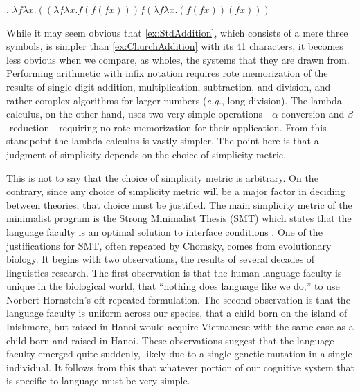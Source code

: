 \documentclass[MilwayThesis]{subfiles}
\begin{document}
\ex.\label{ex:ChurchAddition} $\lambda f \lambda x . ((\lambda f \lambda x . f(f(f x))) f(\lambda f \lambda x . (f(f x))(f x)))$

While it may seem obvious that \cref{ex:StdAddition}, which consists of a mere three symbols, is simpler than \cref{ex:ChurchAddition} with its 41 characters, it becomes less obvious when we compare, as wholes, the systems that they are drawn from.
Performing arithmetic with infix notation requires rote memorization of the results of single digit addition, multiplication, subtraction, and division, and rather complex algorithms for larger numbers (\textit{e.g.}, long division).
The lambda calculus, on the other hand, uses two very simple operations---$\alpha$-conversion and $\beta$-reduction---requiring no rote memorization for their application.
From this standpoint the lambda calculus is vastly simpler.
The point here is that a judgment of simplicity depends on the choice of simplicity metric.

This is not to say that the choice of simplicity metric is arbitrary.
On the contrary, since any choice of simplicity metric will be a major factor in deciding between theories, that choice must be justified.
The main simplicity metric of the minimalist program is the Strong Minimalist Thesis (SMT) which states that the language faculty is an optimal solution to interface conditions \parencite{chomsky2001derivation}.
One of the justifications for SMT, often repeated by Chomsky, comes from evolutionary biology.
It begins with two observations, the results of several decades of linguistics research.
The first observation is that the human language faculty is unique in the biological world, that ``nothing does language like we do,'' to use Norbert Hornstein's oft-repeated formulation.
The second observation is that the language faculty is uniform across our species, that a child born on the island of Inishmore, but raised in Hanoi would acquire Vietnamese with the same ease as a child born and raised in Hanoi.
These observations suggest that the language faculty emerged quite suddenly, likely due to a single genetic mutation in a single individual.
It follows from this that whatever portion of our cognitive system that is specific to language must be very simple.
\end{document}
